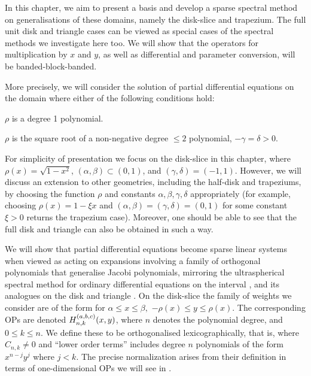 In this chapter, we aim to present a basis and develop a sparse spectral method on generalisations of these domains, namely the disk-slice and trapezium. The full unit disk and triangle cases can be viewed as special cases of the spectral methods we investigate here too. We will show that the operators for multiplication by $x$ and $y$, as well as differential and parameter conversion, will be banded-block-banded.

More precisely, we will consider the solution of partial differential equations on the domain
where  either of the following conditions hold:

\begin{condition}\label{cond:trap}
	$\rho$ is a degree 1 polynomial.
\end{condition}
\begin{condition}\label{cond:disk}
	$\rho$ is the square root of a non-negative degree $\le 2$ polynomial, $-\gamma = \delta > 0$.
\end{condition}

For simplicity of presentation we focus on the disk-slice in this chapter, where $\rho(x) = \sqrt{1-x^2}$, $(\alpha,\beta) \subset (0, 1)$, and $(\gamma, \delta)  = (-1,1)$. However, we will discuss an extension to other geometries, including the half-disk and trapeziums, by choosing the function $\rho$ and constants $\alpha, \beta, \gamma, \delta$ appropriately (for example, choosing $\rho(x) = 1-\xi x$ and $(\alpha,\beta) = (\gamma, \delta) = (0, 1)$ for some constant $\xi > 0$ returns the trapezium case). Moreover, one should be able to see that the full disk and triangle can also be obtained in such a way.

We will show that partial differential equations become sparse linear systems when viewed as acting on expansions involving a family of orthogonal polynomials that generalise Jacobi polynomials, mirroring the ultraspherical spectral method for ordinary differential equations on the interval \cite{olver2013fast}, and its analogues on the disk \cite{vasil2016tensor} and triangle \cite{olver2018recurrence,olver2019triangle}. On the disk-slice the family of weights we consider are of the form 
for $\alpha \leq x \leq \beta,$ $-\rho(x) \leq y \leq \rho(x)$. The corresponding OPs are denoted $H_{n,k}^{(a,b,c)}(x,y)$, where $n$ denotes the polynomial degree, and $0 \le k \le n$. We define these to be orthogonalised lexicographically, that is,
where $C_{n,k} \neq 0$ and \enquote{lower order terms} includes degree $n$ polynomials of the form $x^{n-j} y^j$ where $j < k$. The precise normalization arises from their definition in terms of one-dimensional OPs we will see in .

